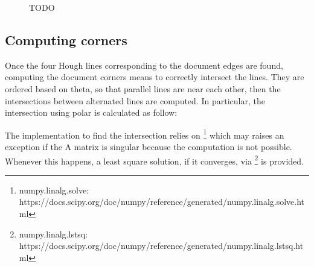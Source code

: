 \documentclass[a4paper]{article}
\begin{document}
\begin{figure}[H]
	\caption{TODO}
	\label{fig:hough}
\end{figure}

\subsection{Computing corners}

Once the four Hough lines corresponding to the document edges are found, computing the document corners means to correctly intersect the lines. They are ordered based on theta, so that parallel lines are near each other, then the intersections between alternated lines are computed. In particular, the intersection using polar is calculated as follow:


The implementation to find the intersection relies on \footnote{ numpy.linalg.solve: https://docs.scipy.org/doc/numpy/reference/generated/numpy.linalg.solve.html} which may raises an exception if the A matrix is singular because the computation is not possible. Whenever this happens, a least square solution, if it converges, via \footnote{numpy.linalg.lstsq: https://docs.scipy.org/doc/numpy/reference/generated/numpy.linalg.lstsq.html} is provided.
\end{document}
